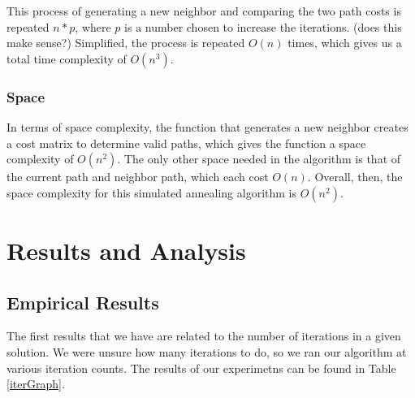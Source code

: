 \documentclass{article}
\def\bigO#1{$O(#1)$}
\begin{document}
\begin{multicols}{2}
        This process of generating a new neighbor and comparing the two path costs is repeated $n * p$, where $p$ is a number chosen to increase the iterations. (does this make sense?) Simplified, the process is repeated \bigO{n} times, which gives us a total time complexity of \bigO{n^3}.
    
        \subsubsection{Space}

        In terms of space complexity, the function that generates a new neighbor creates a cost matrix to determine valid paths, which gives the function a space complexity of \bigO{n^2}. The only other space needed in the algorithm is that of the current path and neighbor path, which each cost \bigO{n}. Overall, then, the space complexity for this simulated annealing algorithm is \bigO{n^2}.
        
        \section{Results and Analysis}\label{results}
        \subsection{Empirical Results}

        The first results that we have are related to the number of iterations in a given solution. We were unsure how many iterations to do, so we ran our algorithm at various iteration counts. The results of our experimetns can be found in Table \ref{iterGraph}. 
        
    \end{multicols}

    
\end{document}
